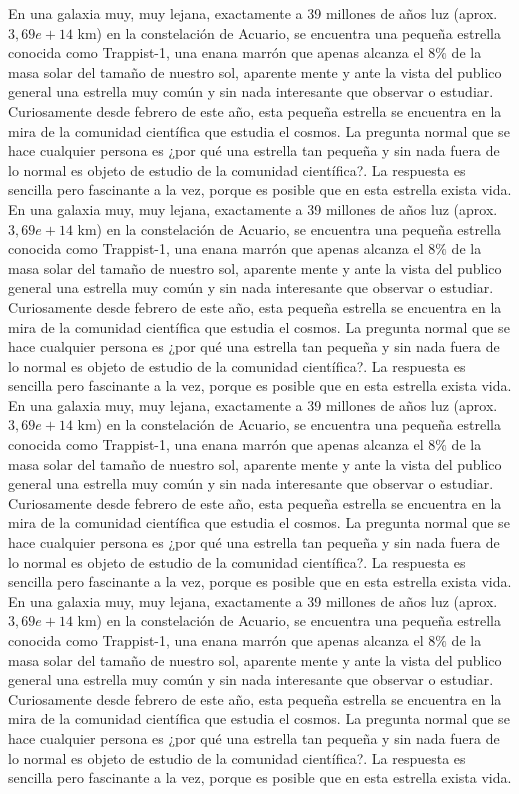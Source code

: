 \documentclass[3p,times]{elsarticle}
\begin{document}
En una galaxia muy, muy lejana, exactamente a 39 millones de años luz (aprox. $3,69e+14$ km) en la constelación de Acuario, se encuentra una pequeña estrella conocida como Trappist-1, una enana marrón  que apenas alcanza el  $8\%$ de la masa solar del tamaño de nuestro sol, aparente mente y ante la vista del publico general una estrella muy común y sin nada interesante que observar o estudiar.  Curiosamente desde febrero de este año, esta pequeña estrella se encuentra en la mira de la comunidad científica que estudia el cosmos. La pregunta normal que se hace cualquier persona es ¿por qué una estrella tan pequeña y sin nada fuera de lo normal es objeto de estudio de la comunidad científica?. La respuesta es sencilla pero fascinante a la vez, porque es posible que en esta estrella exista vida.
En una galaxia muy, muy lejana, exactamente a 39 millones de años luz (aprox. $3,69e+14$ km) en la constelación de Acuario, se encuentra una pequeña estrella conocida como Trappist-1, una enana marrón  que apenas alcanza el  $8\%$ de la masa solar del tamaño de nuestro sol, aparente mente y ante la vista del publico general una estrella muy común y sin nada interesante que observar o estudiar.  Curiosamente desde febrero de este año, esta pequeña estrella se encuentra en la mira de la comunidad científica que estudia el cosmos. La pregunta normal que se hace cualquier persona es ¿por qué una estrella tan pequeña y sin nada fuera de lo normal es objeto de estudio de la comunidad científica?. La respuesta es sencilla pero fascinante a la vez, porque es posible que en esta estrella exista vida.
En una galaxia muy, muy lejana, exactamente a 39 millones de años luz (aprox. $3,69e+14$ km) en la constelación de Acuario, se encuentra una pequeña estrella conocida como Trappist-1, una enana marrón  que apenas alcanza el  $8\%$ de la masa solar del tamaño de nuestro sol, aparente mente y ante la vista del publico general una estrella muy común y sin nada interesante que observar o estudiar.  Curiosamente desde febrero de este año, esta pequeña estrella se encuentra en la mira de la comunidad científica que estudia el cosmos. La pregunta normal que se hace cualquier persona es ¿por qué una estrella tan pequeña y sin nada fuera de lo normal es objeto de estudio de la comunidad científica?. La respuesta es sencilla pero fascinante a la vez, porque es posible que en esta estrella exista vida.
En una galaxia muy, muy lejana, exactamente a 39 millones de años luz (aprox. $3,69e+14$ km) en la constelación de Acuario, se encuentra una pequeña estrella conocida como Trappist-1, una enana marrón  que apenas alcanza el  $8\%$ de la masa solar del tamaño de nuestro sol, aparente mente y ante la vista del publico general una estrella muy común y sin nada interesante que observar o estudiar.  Curiosamente desde febrero de este año, esta pequeña estrella se encuentra en la mira de la comunidad científica que estudia el cosmos. La pregunta normal que se hace cualquier persona es ¿por qué una estrella tan pequeña y sin nada fuera de lo normal es objeto de estudio de la comunidad científica?. La respuesta es sencilla pero fascinante a la vez, porque es posible que en esta estrella exista vida.
\end{document}
